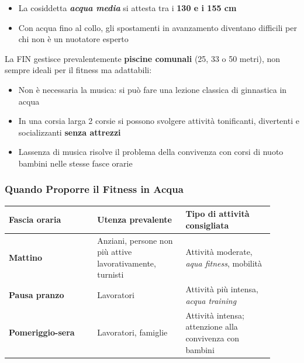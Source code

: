 \documentclass[a4paper,11pt]{article}
\providecommand{\tightlist}{%
  \setlength{\itemsep}{0pt}\setlength{\parskip}{0pt}}
\begin{document}
\begin{itemize}
      \tightlist
      \item
            La cosiddetta \textbf{\emph{acqua media}} si attesta tra i \textbf{130
                  e i 155 cm}
      \item
            Con acqua fino al collo, gli spostamenti in avanzamento diventano
            difficili per chi non è un nuotatore esperto
\end{itemize}

La FIN gestisce prevalentemente \textbf{piscine comunali} (25, 33 o 50
metri), non sempre ideali per il fitness ma adattabili:

\begin{itemize}
      \tightlist
      \item
            Non è necessaria la musica: si può fare una lezione classica di
            ginnastica in acqua
      \item
            In una corsia larga 2 corsie si possono svolgere attività tonificanti,
            divertenti e socializzanti \textbf{senza attrezzi}
      \item
            L\textquotesingle assenza di musica risolve il problema della
            convivenza con corsi di nuoto bambini nelle stesse fasce orarie
\end{itemize}

\subsubsection{Quando Proporre il Fitness in
      Acqua}\label{quando-proporre-il-fitness-in-acqua}

\begin{longtable}[]{@{}p{0.30\linewidth}p{0.30\linewidth}p{0.30\linewidth}@{}}
      \toprule\noalign{}
      Fascia oraria            & Utenza prevalente                                & Tipo di attività consigliata      \\
      \midrule\noalign{}
      \endhead
      \bottomrule\noalign{}
      \endlastfoot
      \textbf{Mattino}         & Anziani, persone non più attive lavorativamente,
      turnisti                 & Attività moderate, \emph{aqua fitness}, mobilità                                     \\
      \textbf{Pausa pranzo}    & Lavoratori                                       & Attività più intensa, \emph{acqua
      training}                                                                                                       \\
      \textbf{Pomeriggio-sera} & Lavoratori, famiglie                             & Attività intensa;
      attenzione alla convivenza con bambini                                                                          \\
\end{longtable}
\end{document}
